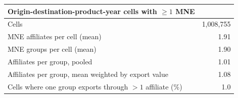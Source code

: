 \begin{tabular}{lr}
\toprule
Origin-destination-product-year cells with $\geq 1$ MNE & \\
\midrule
Cells & 1,008,755 \\
MNE affiliates per cell (mean) & 1.91 \\
MNE groups per cell (mean) & 1.90 \\
Affiliates per group, pooled & 1.01 \\
Affiliates per group, mean weighted by export value & 1.08 \\
Cells where one group exports through $>1$ affiliate (\%) & 1.0 \\
\bottomrule
\end{tabular}
